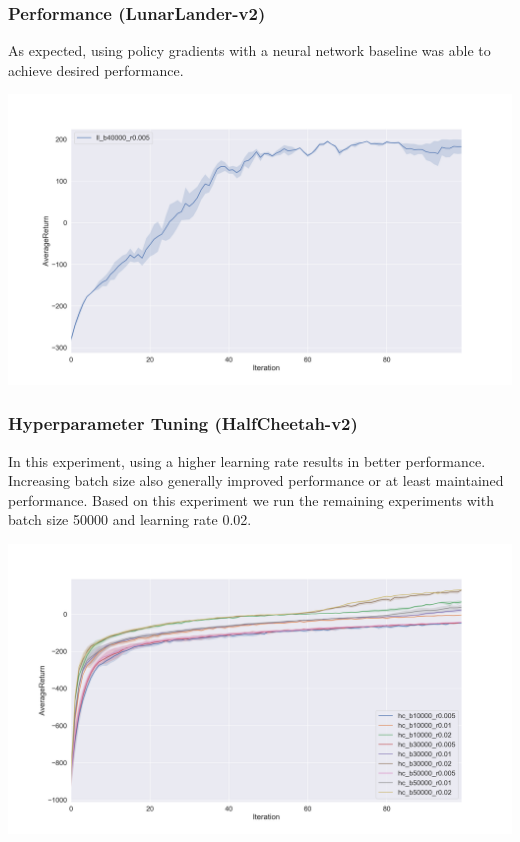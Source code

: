 \documentclass{article}
\begin{document}
    \subsubsection{Performance (LunarLander-v2)}
    As expected, using policy gradients with a neural network baseline was 
    able to achieve desired performance.
    \begin{center}
        \noindent\includegraphics[scale=0.3]{lunarLander}
    \end{center}

    \subsubsection{Hyperparameter Tuning (HalfCheetah-v2)}
    In this experiment, using a higher learning rate results in better performance.
    Increasing batch size also generally improved performance or at least 
    maintained performance. Based on this experiment
    we run the remaining experiments with batch size 50000 and learning rate 0.02.

    \begin{center}
        \noindent\includegraphics[scale=0.3]{hyperParamsCheetah}
    \end{center}
\end{document}
